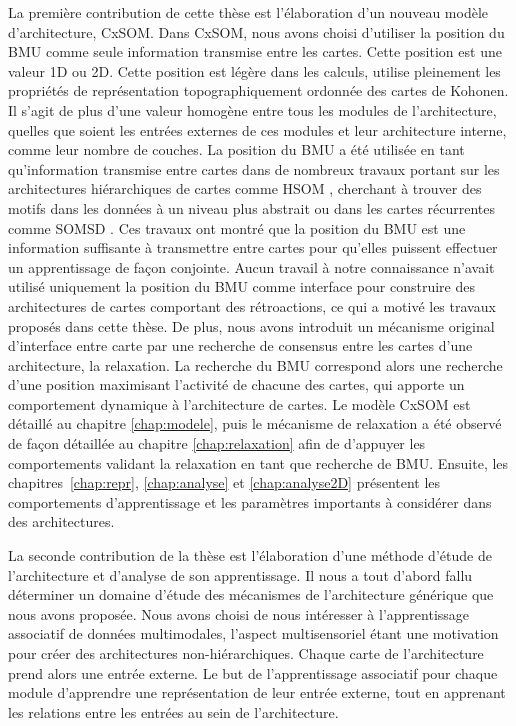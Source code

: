 La première contribution de cette thèse est l'élaboration d'un nouveau modèle d'architecture, CxSOM.
Dans CxSOM, nous avons choisi d'utiliser la position du BMU comme seule information transmise entre les cartes. Cette position est une valeur 1D ou 2D. 
Cette position est légère dans les calculs, utilise pleinement les propriétés de représentation topographiquement ordonnée des cartes de Kohonen. Il s'agit de plus d'une valeur homogène entre tous les modules de l'architecture, quelles que soient les entrées externes de ces modules et leur architecture interne, comme leur nombre de couches.
La position du BMU a été utilisée en tant qu'information transmise entre cartes dans de nombreux travaux portant sur les architectures hiérarchiques de cartes comme HSOM \parencite{lampinen_clustering_1992}, cherchant à trouver des motifs dans les données à un niveau plus abstrait ou dans les cartes récurrentes comme SOMSD \parencite{hagenbuchner_self-organizing_2003}. 
Ces travaux ont montré que la position du BMU est une information suffisante à transmettre entre cartes pour qu'elles puissent effectuer un apprentissage de façon conjointe.
Aucun travail à notre connaissance n'avait utilisé uniquement la position du BMU comme interface pour construire des architectures de cartes comportant des rétroactions, ce qui a motivé les travaux proposés dans cette thèse.
De plus, nous avons introduit un mécanisme original d'interface entre carte par une recherche de consensus entre les cartes d'une architecture, la relaxation.
La recherche du BMU correspond alors une recherche d'une position maximisant l'activité de chacune des cartes, qui apporte un comportement dynamique à l'architecture de cartes.
Le modèle CxSOM est détaillé au chapitre \ref{chap:modele}, puis le mécanisme de relaxation a été observé de façon détaillée au chapitre \ref{chap:relaxation} afin de d'appuyer les comportements validant la relaxation en tant que recherche de BMU. Ensuite, les chapitres~\ref{chap:repr}, \ref{chap:analyse} et \ref{chap:analyse2D} présentent les comportements d'apprentissage et les paramètres importants à considérer dans des architectures.

La seconde contribution de la thèse est l'élaboration d'une méthode d'étude de l'architecture et d'analyse de son apprentissage. 
Il nous a tout d'abord fallu déterminer un domaine d'étude des mécanismes de l'architecture générique que nous avons proposée. Nous avons choisi de nous intéresser à l'apprentissage associatif de données multimodales, l'aspect multisensoriel étant une motivation pour créer des architectures non-hiérarchiques. Chaque carte de l'architecture prend alors une entrée externe.
Le but de l'apprentissage associatif pour chaque module d'apprendre une représentation de leur entrée externe, tout en apprenant les relations entre les entrées au sein de l'architecture.

